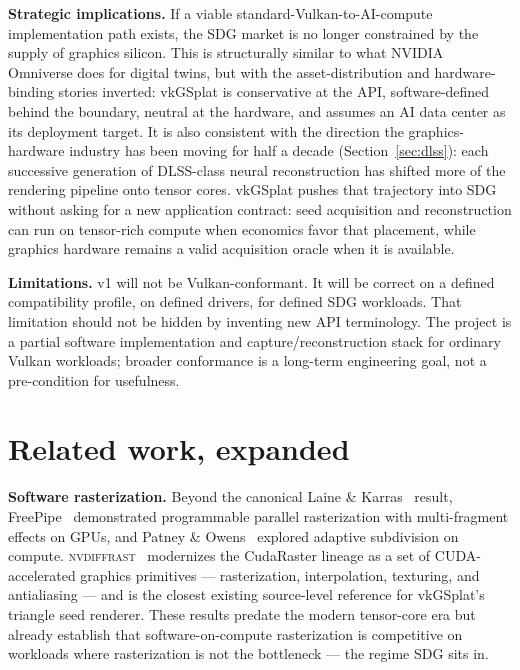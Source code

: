 \documentclass[10pt,journal,onecolumn]{IEEEtran}
\begin{document}
\textbf{Strategic implications.} If a viable standard-Vulkan-to-AI-compute
implementation path exists, the SDG market is no longer constrained by the
supply of graphics silicon. This is structurally similar to what NVIDIA
Omniverse does for digital twins, but with the asset-distribution and
hardware-binding stories inverted: vkGSplat is conservative at the API,
software-defined behind the boundary, neutral at the hardware, and assumes an AI
data center as its deployment target. It is also consistent with the direction the
graphics-hardware industry has been moving for half a decade
(Section~\ref{sec:dlss}): each successive generation of DLSS-class
neural reconstruction has shifted more of the rendering pipeline onto
tensor cores. vkGSplat pushes that trajectory into SDG without asking for a new
application contract: seed acquisition and reconstruction can run on tensor-rich
compute when economics favor that placement, while graphics hardware remains a
valid acquisition oracle when it is available.

\textbf{Limitations.} v1 will not be Vulkan-conformant. It will be correct on a
defined compatibility profile, on defined drivers, for defined SDG workloads.
That limitation should not be hidden by inventing new API terminology. The
project is a partial software implementation and capture/reconstruction stack
for ordinary Vulkan workloads; broader conformance is a long-term engineering
goal, not a pre-condition for usefulness.

\section{Related work, expanded}

\textbf{Software rasterization.} Beyond the canonical Laine \&
Karras~\cite{laine2011software} result, FreePipe~\cite{liu2010freepipe}
demonstrated programmable parallel rasterization with multi-fragment
effects on GPUs, and Patney \& Owens~\cite{patney2010real} explored
adaptive subdivision on compute. \textsc{nvdiffrast}~\cite{laine2020nvdiffrast}
modernizes the CudaRaster lineage as a set of CUDA-accelerated
graphics primitives --- rasterization, interpolation, texturing, and
antialiasing --- and is the closest existing source-level reference for
vkGSplat's triangle seed renderer. These results predate the modern
tensor-core era but already establish that software-on-compute
rasterization is competitive on workloads where rasterization is not
the bottleneck --- the regime SDG sits in.
\end{document}
